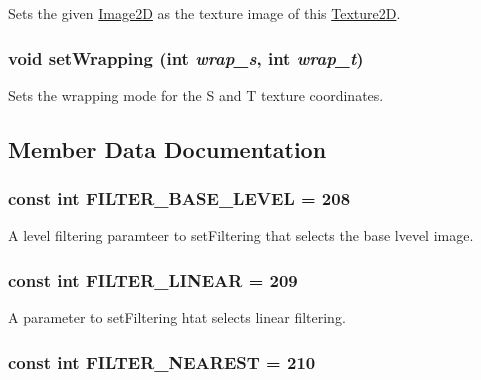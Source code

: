 Sets the given \hyperlink{classm3g_1_1Image2D}{Image2D} as the texture image of this \hyperlink{classm3g_1_1Texture2D}{Texture2D}. \hypertarget{classm3g_1_1Texture2D_e676f34bd2f5ee1508ad1cb771702d8f}{
\subsubsection[{setWrapping}]{\setlength{\rightskip}{0pt plus 5cm}void setWrapping (int {\em wrap\_\-s}, \/  int {\em wrap\_\-t})}}
\label{classm3g_1_1Texture2D_e676f34bd2f5ee1508ad1cb771702d8f}


Sets the wrapping mode for the S and T texture coordinates. 

\subsection{Member Data Documentation}
\hypertarget{classm3g_1_1Texture2D_d1924d32385b5353ad11ecd8b1ec0ad5}{
\subsubsection[{FILTER\_\-BASE\_\-LEVEL}]{\setlength{\rightskip}{0pt plus 5cm}const int {\bf FILTER\_\-BASE\_\-LEVEL} = 208}}
\label{classm3g_1_1Texture2D_d1924d32385b5353ad11ecd8b1ec0ad5}


A level filtering paramteer to setFiltering that selects the base lvevel image. \hypertarget{classm3g_1_1Texture2D_5f06003f50141919a3665d22f55602a8}{
\subsubsection[{FILTER\_\-LINEAR}]{\setlength{\rightskip}{0pt plus 5cm}const int {\bf FILTER\_\-LINEAR} = 209}}
\label{classm3g_1_1Texture2D_5f06003f50141919a3665d22f55602a8}


A parameter to setFiltering htat selects linear filtering. \hypertarget{classm3g_1_1Texture2D_1ee2e06d6462fdafd5f17e63eddfb8fe}{
\subsubsection[{FILTER\_\-NEAREST}]{\setlength{\rightskip}{0pt plus 5cm}const int {\bf FILTER\_\-NEAREST} = 210}}
\label{classm3g_1_1Texture2D_1ee2e06d6462fdafd5f17e63eddfb8fe}


